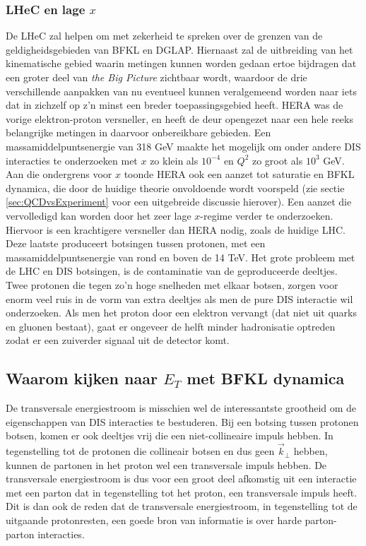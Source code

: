 \documentclass[a4paper,11pt]{article}
\numberwithin{equation}{section} %
\begin{document}
    \subsubsection{LHeC en lage $x$}
De LHeC zal helpen om met zekerheid te spreken over de grenzen van de geldigheidsgebieden van BFKL en DGLAP.
Hiernaast zal de uitbreiding van het kinematische gebied waarin metingen kunnen worden gedaan ertoe bijdragen dat een groter deel van \textit{the Big Picture} zichtbaar wordt, waardoor de drie verschillende aanpakken van nu eventueel kunnen veralgemeend worden naar iets dat in zichzelf op z’n minst een breder toepassingsgebied heeft.
HERA was de vorige elektron-proton versneller, en heeft de deur opengezet naar een hele reeks belangrijke metingen in daarvoor onbereikbare gebieden.
Een massamiddelpuntsenergie van 318 GeV maakte het mogelijk om onder andere DIS  interacties te onderzoeken met $x$ zo klein als $10^{-4}$ en $Q^2$ zo groot als $10^3$ GeV.
Aan die ondergrens voor $x$ toonde HERA ook een aanzet tot saturatie en BFKL dynamica, die door de huidige theorie onvoldoende wordt voorspeld (zie sectie \ref{sec:QCDvsExperiment} voor een uitgebreide discussie hierover).
Een aanzet die vervolledigd kan worden door het zeer lage $x$-regime verder te onderzoeken.
Hiervoor is een krachtigere versneller dan HERA nodig, zoals de huidige LHC.
Deze laatste produceert botsingen tussen protonen, met een massamiddelpuntsenergie van rond en boven de 14 TeV.
Het grote probleem met de LHC en DIS botsingen, is de contaminatie van de geproduceerde deeltjes.
Twee protonen die tegen zo’n hoge snelheden met elkaar botsen, zorgen voor enorm veel ruis in de vorm van extra deeltjes als men de pure DIS interactie wil onderzoeken.
Als men het proton door een elektron vervangt (dat niet uit quarks en gluonen bestaat), gaat er ongeveer de helft minder hadronisatie optreden zodat er een zuiverder signaal uit de detector komt.

  \subsection{Waarom kijken naar $E_T$ met BFKL dynamica}
De transversale energiestroom is misschien wel de interessantste grootheid om de eigenschappen van DIS interacties te bestuderen.
Bij een botsing tussen protonen botsen, komen er ook deeltjes vrij die een niet-collineaire impuls hebben.
In tegenstelling tot de protonen die collineair botsen en dus geen $\vec{k}_\perp$ hebben, kunnen de partonen in het proton wel een transversale impuls hebben.
De transversale energiestroom is dus voor een groot deel afkomstig uit een interactie met een parton dat in tegenstelling tot het proton, een transversale impuls heeft.
Dit is dan ook de reden dat de transversale energiestroom, in tegenstelling tot de uitgaande protonresten, een goede bron van informatie is over harde parton-parton interacties.
\end{document}
